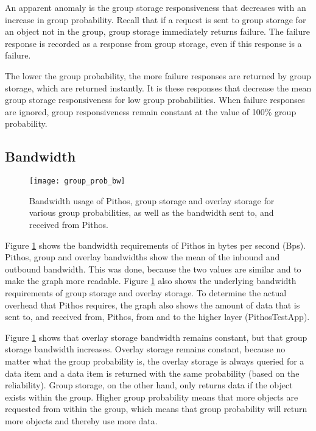 An apparent anomaly is the group storage responsiveness that decreases with an increase in group probability. Recall that if a request is sent to group storage for an object not in the group, group storage immediately returns failure. The failure response is recorded as a response from group storage, even if this response is a failure.

The lower the group probability, the more failure responses are returned by group storage, which are returned instantly. It is these responses that decrease the mean group storage responsiveness for low group probabilities. When failure responses are ignored, group responsiveness remain constant at the value of 100\% group probability.

\subsection{Bandwidth}
\label{group_probability_bandwidth}

\begin{figure}[htbp]
 \centering
 \texttt{[image: group\_prob\_bw]}
 \caption{Bandwidth usage of Pithos, group storage and overlay storage for various group probabilities, as well as the bandwidth sent to, and received from Pithos.}
 \label{fig_group_prob_bw}
\end{figure}
%
Figure \ref{fig_group_prob_bw} shows the bandwidth requirements of Pithos in bytes per second (Bps). Pithos, group and overlay bandwidths show the mean of the inbound and outbound bandwidth. This was done, because the two values are similar and to make the graph more readable. Figure \ref{fig_group_prob_bw} also shows the underlying bandwidth requirements of group storage and overlay storage. To determine the actual overhead that Pithos requires, the graph also shows the amount of data that is sent to, and received from, Pithos, from and to the higher layer (PithosTestApp).

Figure \ref{fig_group_prob_bw} shows that overlay storage bandwidth remains constant, but that group storage bandwidth increases. Overlay storage remains constant, because no matter what the group probability is, the overlay storage is always queried for a data item and a data item is returned with the same probability (based on the reliability). Group storage, on the other hand, only returns data if the object exists within the group. Higher group probability means that more objects are requested from within the group, which means that group probability will return more objects and thereby use more data.

